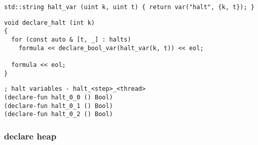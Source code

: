 \begin{algorithm}[H]
\end{algorithm}

\begin{algorithm}[H]
\end{algorithm}

\begin{lstlisting}[style=c++]
std::string halt_var (uint k, uint t) { return var("halt", {k, t}); }
\end{lstlisting}

\begin{lstlisting}[style=c++]
void declare_halt (int k)
{
  for (const auto & [t, _] : halts)
    formula << declare_bool_var(halt_var(k, t)) << eol;

  formula << eol;
}
\end{lstlisting}

\begin{lstlisting}[language=SMTLib]
; halt variables - halt_<step>_<thread>
(declare-fun halt_0_0 () Bool)
(declare-fun halt_0_1 () Bool)
(declare-fun halt_0_2 () Bool)
\end{lstlisting}

\subsubsection{declare heap}

\begin{algorithm}[H]
\end{algorithm}

